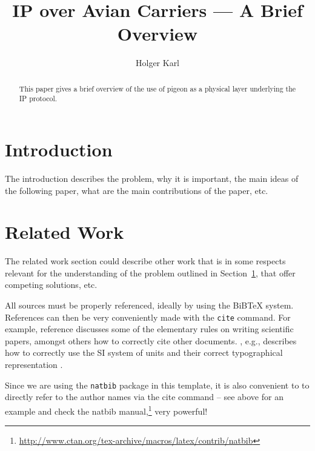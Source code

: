 \documentclass[12pt,twoside,doublepage]{article}
\newcommand{\teilnehmer}{Holger Karl}
\newcommand{\ausarbeitung}{IP over Avian Carriers --- A Brief
  Overview}
\begin{document}
\title{\ausarbeitung}
\author{\teilnehmer}
\date{}
\maketitle
\thispagestyle{empty}



\begin{abstract}
  This paper gives a brief overview of the use of pigeon as a physical
  layer underlying  the IP protocol.
\end{abstract}


\section{Introduction}
\label{sec:introduction}

The introduction describes the problem, why it is important, the main
ideas of the following paper, what are the main contributions of the
paper, etc.

\section{Related Work}
\label{sec:relwork}

The related work section could describe other work that is in some
respects relevant for the understanding of the problem outlined in
Section~\ref{sec:introduction}, that offer competing solutions, etc.

All sources must be properly referenced, ideally by using the BiBTeX
system. References can then be very conveniently made with the
\texttt{cite} command. For example, reference
 discusses some of the elementary rules on
writing scientific papers, amongst others how to correctly cite other
documents. \citeauthor{Taylor:SIGuide:95}, e.g., describes how to
correctly use the SI system of units and their correct typographical
representation \citep{Taylor:SIGuide:95}.

Since we are using the  \texttt{natbib} package in this template, it is also convenient to
to directly refer to the author names via the cite command -- see
above for an example and check the natbib manual,\footnote{\url{http://www.ctan.org/tex-archive/macros/latex/contrib/natbib}}  very powerful!
\end{document}
